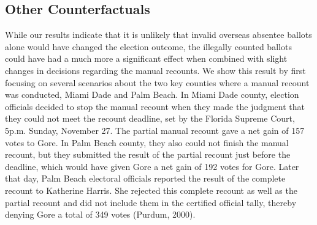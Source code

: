 \documentclass[11pt,titlepage]{article}
\begin{document}
\subsection{Other Counterfactuals}

While our results indicate that it is unlikely that invalid overseas
absentee ballots alone would have changed the election outcome, the
illegally counted ballots could have had a much more a significant
effect when combined with slight changes in decisions regarding the
manual recounts.  We show this result by first focusing on several
scenarios about the two key counties where a manual recount was
conducted, Miami Dade and Palm Beach. In Miami Dade county, election
officials decided to stop the manual recount when they made the
judgment that they could not meet the recount deadline, set by the
Florida Supreme Court, 5p.m.  Sunday, November 27.  The partial manual
recount gave a net gain of 157 votes to Gore. In Palm Beach county,
they also could not finish the manual recount, but they submitted the
result of the partial recount just before the deadline, which would
have given Gore a net gain of 192 votes for Gore. Later that day, Palm
Beach electoral officials reported the result of the complete recount
to Katherine Harris.  She rejected this complete recount as well as
the partial recount and did not include them in the certified official
tally, thereby denying Gore a total of 349 votes
\nocite{purd:00}(Purdum, 2000).
\end{document}

